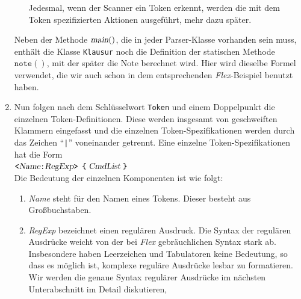\begin{enumerate}
\begin{enumerate}
            Jedesmal, wenn der Scanner ein Token erkennt, werden die mit dem Token
            spezifizierten Aktionen ausgef\"uhrt, mehr dazu sp\"ater.
      \end{enumerate}
      Neben der Methode $\textsl{main}()$, die in jeder Parser-Klasse vorhanden
      sein muss, enth\"alt die Klasse \texttt{Klausur} noch die Definition der statischen
      Methode $\texttt{note}()$, mit der sp\"ater die Note berechnet wird.  Hier
      wird dieselbe Formel verwendet, die wir auch schon in dem entsprechenden
      \textsl{Flex}-Beispiel benutzt haben.
\item Nun folgen nach dem Schl\"usselwort \texttt{Token} und einem Doppelpunkt die
      einzelnen Token-Definitionen.  Diese werden insgesamt von geschweiften Klammern
      eingefasst und die einzelnen Token-Spezifikationen werden durch das
      Zeichen ``\texttt{|}'' voneinander getrennt.  Eine einzelne Token-Spezifikationen hat die
      Form
      \\[0.2cm]
      \hspace*{1.3cm} $\texttt{<}\textsl{Name}\texttt{:} \textsl{RegExp}\texttt{>}$ $\texttt{\{} \;\textsl{CmdList}\; \texttt{\}}$
      \\[0.2cm]
      Die Bedeutung der einzelnen Komponenten ist wie folgt:
      \begin{enumerate}
      \item \textsl{Name}\/ steht f\"ur den Namen eines Tokens.  Dieser besteht aus
            Gro{\ss}buchstaben.  
      \item \textsl{RegExp}\/ bezeichnet einen regul\"aren Ausdruck.  Die Syntax der
            regul\"aren Ausdr\"ucke weicht von der bei \textsl{Flex}\/ gebr\"auchlichen
            Syntax stark ab.  Insbesondere haben Leerzeichen und Tabulatoren keine
            Bedeutung, so dass es m\"oglich ist, komplexe regul\"are Ausdr\"ucke lesbar zu
            formatieren.  Wir werden die genaue Syntax regul\"arer Ausdr\"ucke im n\"achsten
            Unterabschnitt im Detail diskutieren,
            

\end{enumerate}
\end{enumerate}
